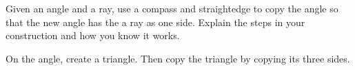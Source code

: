 \documentclass[nooutcomes]{ximera}
\begin{document}

\begin{problem}
Given an angle and a ray, use a compass and straightedge to copy the angle so that the new angle has the a ray as one side. Explain the steps in your construction and how you know it works.
\begin{freeResponse}
\begin{hint}
On the angle, create a triangle.  Then copy the triangle by copying its three sides.  
\end{hint}
\end{freeResponse}
\end{problem}
\end{document}
